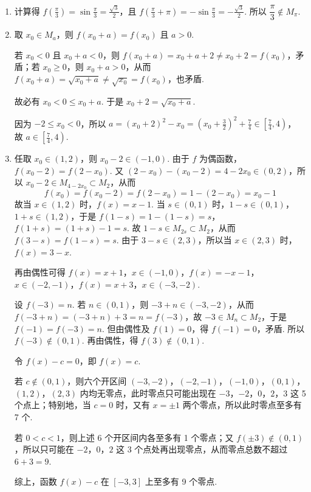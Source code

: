 \documentclass[UTF8,a4paper,oneside,11pt]{ctexbook}
\begin{document}
\begin{solution}
\begin{enumerate}
\item 计算得 \(f\left(\frac{\pi}{3}\right)=\sin\frac{\pi}{3}=\frac{\sqrt{3}}{2}\)，且 \(f\left(\frac{\pi}{3}+\pi\right)=-\sin\frac{\pi}{3}=-\frac{\sqrt{3}}{2}\). 所以 \(\dfrac{\pi}{3}\notin M_{\pi}\).

\item 取 \(x_0\in M_a\)，则 \(f(x_0+a)=f(x_0)\) 且 \(a>0\).

若 \(x_0<0\) 且 \(x_0+a<0\)，则 \(f(x_0+a)=x_0+a+2\ne x_0+2=f(x_0)\)，矛盾；若 \(x_0\ge0\)，则 \(x_0+a>0\)，从而 \(f(x_0+a)=\sqrt{x_0+a}\ne\sqrt{x_0}=f(x_0)\)，也矛盾.

故必有 \(x_0<0\le x_0+a\). 于是 \(x_0+2=\sqrt{x_0+a}\).

因为 \(-2\le x_0<0\)，所以
\(
a=(x_0+2)^2-x_0=\left(x_0+\frac{3}{2}\right)^2+\frac{7}{4}\in\left[\frac{7}{4},4\right)
\)，
故 \(a\in\left[\frac{7}{4},4\right)\).

\item 任取 \(x_0\in(1,2)\)，则 \(x_0-2\in(-1,0)\). 由于 \(f\) 为偶函数，\(f(x_0-2)=f(2-x_0)\). 又 \((2-x_0)-(x_0-2)=4-2x_0\in(0,2)\)，所以 \(x_0-2\in M_{4-2x_0}\subset M_2\)，从而
\[
f(x_0)=f(x_0-2)=f(2-x_0)=1-(2-x_0)=x_0-1
\]
故当 \(x\in(1,2)\) 时，\(f(x)=x-1\).
当 \(s\in(0,1)\) 时，\(1-s\in(0,1)\)，\(1+s\in(1,2)\)，于是 \(f(1-s)=1-(1-s)=s\)，\(f(1+s)=(1+s)-1=s\). 故 \(1-s\in M_{2s}\subset M_2\)，从而 \(f(3-s)=f(1-s)=s\). 由于 \(3-s\in(2,3)\)，所以当 \(x\in(2,3)\) 时，\(f(x)=3-x\).

再由偶性可得
\(f(x)=x+1\)，\(x\in(-1,0)\)，\(f(x)=-x-1\)，\(x\in(-2,-1)\)，\(f(x)=x+3\)，\(x\in(-3,-2)\).

设 \(f(-3)=n\). 若 \(n\in(0,1)\)，则 \(-3+n\in(-3,-2)\)，从而 \(f(-3+n)=(-3+n)+3=n=f(-3)\)，故 \(-3\in M_n\subset M_2\)，于是 \(f(-1)=f(-3)=n\).
但由偶性及 \(f(1)=0\)，得 \(f(-1)=0\)，矛盾. 所以 \(f(-3)\notin(0,1)\). 再由偶性，得 \(f(3)\notin(0,1)\).

令 \(f(x)-c=0\)，即 \(f(x)=c\).

若 \(c\notin(0,1)\)，则六个开区间
\((-3,-2)\)，\((-2,-1)\)，\((-1,0)\)，\((0,1)\)，\((1,2)\)，\((2,3)\)
内均无零点，此时零点只可能出现在 \(-3\)，\(-2\)，\(0\)，\(2\)，\(3\) 这 5 个点上；特别地，当 \(c=0\) 时，又有 \(x=\pm1\) 两个零点，所以此时零点至多有 7 个.

若 \(0<c<1\)，则上述 6 个开区间内各至多有 1 个零点；又 \(f(\pm3)\notin(0,1)\)，所以只可能在 \(-2\)，\(0\)，\(2\) 这 3 个点处再出现零点，从而零点总数不超过 \(6+3=9\).

综上，函数 \(f(x)-c\) 在 \([-3,3]\) 上至多有 9 个零点.
\end{enumerate}
\end{solution}

\end{document}
